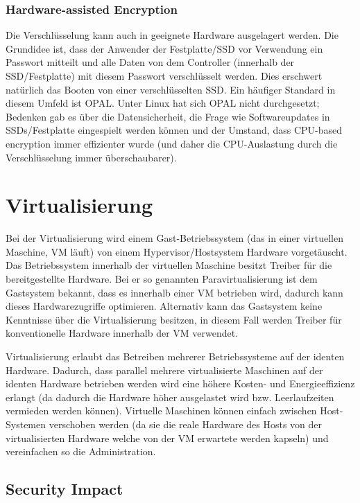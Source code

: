 \subsection{Hardware-assisted Encryption}

Die Verschlüsselung kann auch in geeignete Hardware ausgelagert werden. Die Grundidee ist, dass der Anwender der Festplatte/SSD vor Verwendung ein Passwort mitteilt und alle Daten von dem Controller (innerhalb der SSD/Festplatte) mit diesem Passwort verschlüsselt werden. Dies erschwert natürlich das Booten von einer verschlüsselten SSD. Ein häufiger Standard in diesem Umfeld ist OPAL. Unter Linux hat sich OPAL nicht durchgesetzt; Bedenken gab es über die Datensicherheit, die Frage wie Softwareupdates in SSDs/Festplatte eingespielt werden können und der Umstand, dass CPU-based encryption immer effizienter wurde (und daher die CPU-Auslastung durch die Verschlüsselung immer überschaubarer).

\chapter{Virtualisierung}

Bei der Virtualisierung wird einem Gast-Betriebssystem (das in einer virtuellen Maschine, VM läuft) von einem Hypervisor/Hostsystem Hardware vorgetäuscht. Das Betriebssystem innerhalb der virtuellen Maschine besitzt Treiber für die bereitgestellte Hardware. Bei er so genannten Paravirtualisierung ist dem Gastsystem bekannt, dass es innerhalb einer VM betrieben wird, dadurch kann dieses Hardwarezugriffe optimieren. Alternativ kann das Gastsystem keine Kenntnisse über die Virtualisierung besitzen, in diesem Fall werden Treiber für konventionelle Hardware innerhalb der VM verwendet.

Virtualisierung erlaubt das Betreiben mehrerer Betriebssysteme auf der identen Hardware. Dadurch, dass parallel mehrere virtualisierte Maschinen auf der identen Hardware betrieben werden wird eine höhere Kosten- und Energieeffizienz erlangt (da dadurch die Hardware höher ausgelastet wird bzw. Leerlaufzeiten vermieden werden können). Virtuelle Maschinen können einfach zwischen Host-Systemen verschoben werden (da sie die reale Hardware des Hosts von der virtualisierten Hardware welche von der VM erwartete werden kapseln) und vereinfachen so die Administration.

\section{Security Impact}

